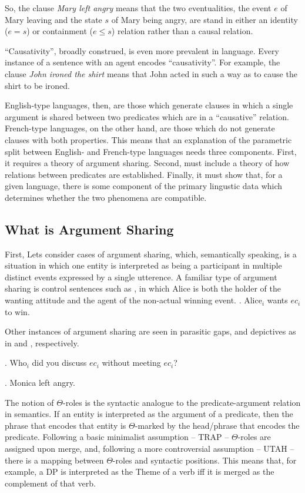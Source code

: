 \documentclass[letterpaper,12pt]{article}
\begin{document}
So, the clause \textit{Mary left angry} means that the two eventualities, the event $e$ of Mary leaving and the state $s$ of Mary being angry, are stand in either an identity ($e=s$) or containment ($e\leq s$) relation rather than a causal relation.

``Causativity'', broadly construed, is even more prevalent in language.
Every instance of a sentence with an agent encodes ``causativity''.
For example, the clause \textit{John ironed the shirt} means that John acted in such a way as to cause the shirt to be ironed.

English-type languages, then, are those which generate clauses in which a single argument is shared between two predicates which are in a ``causative'' relation.
French-type languages, on the other hand, are those which do not generate clauses with both properties.
This means that an explanation of the parametric split between English- and French-type languages needs three components.
First, it requires a theory of argument sharing.
Second, must include a theory of how relations between predicates are established.
Finally, it must show that, for a given language, there is some component of the primary lingustic data which determines whether the two phenomena are compatible.

\subsection{What is Argument Sharing}
First, Lets consider cases of argument sharing, which, semantically speaking, is a situation in which one entity is interpreted as being a participant in multiple distinct events expressed by a single utterence.
A familiar type of argument sharing is control sentences such as \Next, in which Alice is both the holder of the wanting attitude and the agent of the non-actual winning event.
\ex.\label{ex:Control} Alice$_i$ wants $ec_i$ to win.

Other instances of argument sharing are seen in parasitic gaps, and depictives as in \Next and \NNext, respectively.

\ex. Who$_i$ did you discuss $ec_i$ without meeting $ec_i$?

\ex. Monica left angry.

The notion of $\Theta$-roles is the syntactic analogue to the predicate-argument relation in semantics.
If an entity is interpreted as the argument of a predicate, then the phrase that encodes that entity is $\Theta$-marked by the head/phrase that encodes the predicate.
Following a basic minimalist assumption -- TRAP \parencite{hornsteinetal2005understanding} -- $\Theta$-roles are assigned upon merge, and, following a more controversial assumption -- UTAH \parencite{baker1988incorporation}-- there is a mapping between $\Theta$-roles and syntactic positions.
This means that, for example, a DP is interpreted as the Theme of a verb iff it is merged as the complement of that verb.
\end{document}
